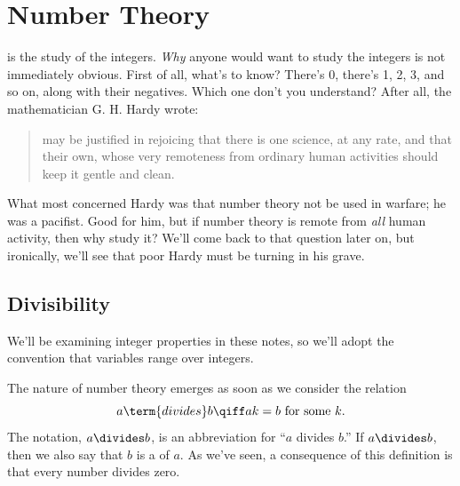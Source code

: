 
\chapter{Number Theory}

 is the study of the integers.  {\em Why} anyone would
want to study the integers is not immediately obvious.  First of all,
what's to know?  There's 0, there's 1, 2, 3, and so on, along with their
negatives.  Which one don't you understand?
After all, the mathematician G. H. Hardy wrote:
 \begin{quotation}
  may be justified in rejoicing that there
 is one science, at any rate, and that their own, whose very remoteness
 from ordinary human activities should keep it gentle and clean.
 \end{quotation}
What most concerned Hardy was that number theory not be used in
warfare; he was a pacifist.  Good for him, but if number theory is
remote from \textit{all} human activity, then why study it?
We'll come back to that question later on, but ironically, we'll see that
poor Hardy must be turning in his grave.


\section{Divisibility}

We'll be examining integer properties in these notes, so we'll adopt the
convention that variables range over integers.

The nature of number theory emerges as soon as we consider the
 relation
\[
a \term{ divides } b \qiff ak = b \text{ for some } k.
\]
The notation, $a \divides b$, is an abbreviation for ``$a$ divides $b$.''
If $a \divides b$, then we also say that $b$ is a  of $a$.
As we've seen, a consequence of this definition is that every number
divides zero.

